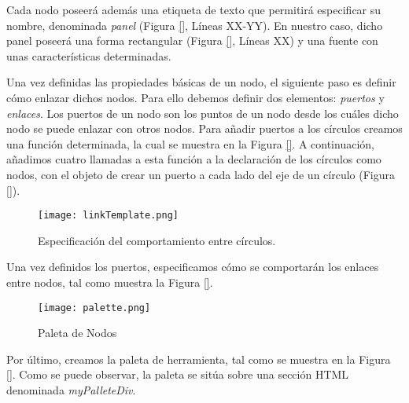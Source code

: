 Cada nodo poseerá además una etiqueta de texto que permitirá especificar su nombre, denominada \emph{panel} (Figura \ref{}, Líneas XX-YY). En nuestro caso, dicho panel poseerá una forma rectangular (Figura \ref{}, Líneas XX) y una fuente con unas características determinadas. 

Una vez definidas las propiedades básicas de un nodo, el siguiente paso es definir cómo enlazar dichos nodos. Para ello debemos definir dos elementos: \emph{puertos} y \emph{enlaces}. Los puertos de un nodo son los puntos de un nodo desde los cuáles dicho nodo se puede enlazar con otros nodos. Para añadir puertos a los círculos creamos una función determinada, la cual se muestra en la Figura \ref{}. %
A continuación, añadimos cuatro llamadas a esta función a la declaración de los círculos como nodos, con el objeto de crear un puerto a cada lado del eje de un círculo (Figura \ref{}).



\begin{figure}[!tb]
	\centering
	\texttt{[image: linkTemplate.png]}
	\caption{Especificación del comportamiento entre círculos.}
    \label{fig:linkTemplate}
\end{figure}

Una vez definidos los puertos, especificamos cómo se comportarán los enlaces entre nodos, tal como muestra la Figura \ref{}. %

\begin{figure}[1tb]
	\centering
	\texttt{[image: palette.png]}
	\caption{Paleta de Nodos}
    \label{fig:palette}
\end{figure}
\vspace{5mm}

Por último, creamos la paleta de herramienta, tal como se muestra en la Figura \ref{}. Como se puede observar, la paleta se sitúa sobre una sección HTML denominada \emph{myPalleteDiv}. 

